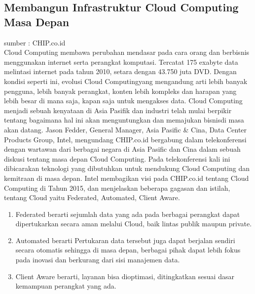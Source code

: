 \subsection{Membangun Infrastruktur Cloud Computing Masa Depan}
\tab sumber : CHIP.co.id \\Cloud Computing membawa perubahan mendasar pada cara orang dan berbisnis menggunakan internet serta perangkat komputasi. Tercatat 175 exabyte data melintasi internet pada tahun 2010, setara dengan 43.750 juta DVD. Dengan kondisi seperti ini, evolusi Cloud Computingyang mengandung arti lebih banyak pengguna, lebih banyak perangkat, konten lebih kompleks dan harapan yang lebih besar di mana saja, kapan saja untuk mengakses data. Cloud Computing menjadi sebuah kenyataan di Asia Pasifik dan industri telah mulai berpikir tentang bagaimana hal ini akan menguntungkan dan memajukan bisnisdi masa akan datang. Jason Fedder, General Manager, Asia Pasific \& Cina, Data Center Products Group,
Intel, mengundang CHIP.co.id bergabung dalam telekonferensi dengan wartawan dari berbagai negara di Asia Pasific dan Cina dalam sebuah diskusi tentang masa depan Cloud Computing. Pada telekonferensi kali ini dibicarakan teknologi yang dibutuhkan untuk mendukung Cloud Computing dan kemitraan di masa depan. Intel membagikan visi pada CHIP.co.id tentang Cloud Computing di Tahun 2015, dan menjelaskan beberapa gagasan dan istilah, tentang Cloud yaitu Federated, Automated, Client Aware.
\begin{enumerate}
\item Federated berarti sejumlah data yang ada pada berbagai perangkat dapat dipertukarkan secara aman melalui Cloud, baik lintas publik maupun private.
\item Automated berarti Pertukaran data tersebut juga dapat berjalan sendiri secara otomatis sehingga di masa depan, berbagai pihak dapat lebih fokus pada inovasi dan berkurang dari sisi manajemen data.
\item Client Aware berarti, layanan bisa dioptimasi, ditingkatkan sesuai dasar kemampuan perangkat yang ada.
\end{enumerate}
